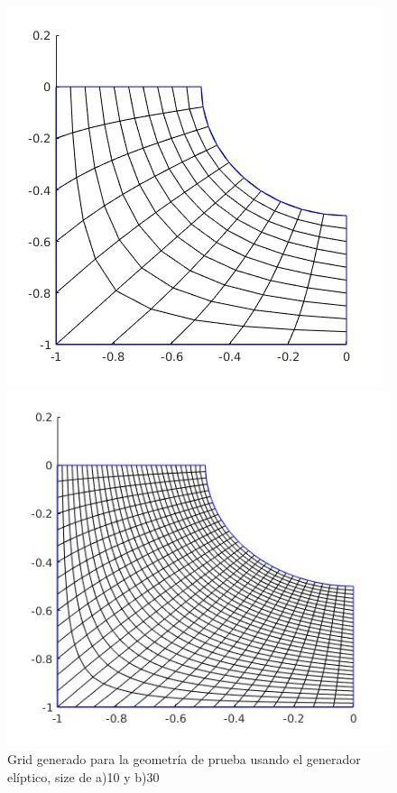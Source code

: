 \documentclass[11pt,letterpaper]{article}
\begin{document}
\begin{figure}[H]
	\begin{minipage}{.49\linewidth}
		\centering
		\includegraphics[scale=0.41]{./imgs/img_elliptic_generator_size_10.jpg}
	\end{minipage}
	\begin{minipage}{.49\linewidth}
		\centering
		\includegraphics[scale=0.41]{./imgs/img_elliptic_generator_size_30.jpg}
	\end{minipage}
	\caption{Grid generado para la geometr\'ia de prueba usando el generador el\'iptico, size de a)10 y b)30}
			\label{fig:img_grid_algebraic}
\end{figure}
	
\end{document}
